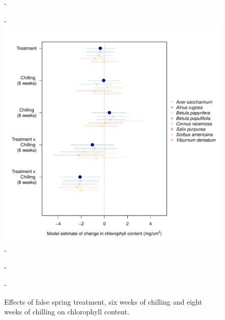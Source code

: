 \documentclass{article}\usepackage[]{graphicx}\usepackage[]{color}
\begin{document}
{\begin{figure} [H]
  -\begin{center}
  -\includegraphics[width=18cm]{..//analyses/figures/chlavg90_brms.pdf} 
  -\caption{Effects of false spring treatment, six weeks of chilling and eight weeks of chilling on chlorophyll content. }\label{fig:muchl}
  -\end{center}
  -\end{figure}}
\end{document}
